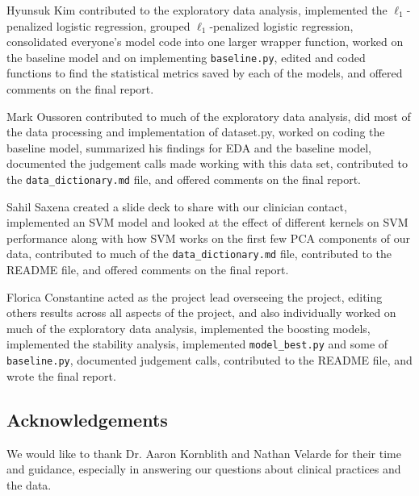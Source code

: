 \documentclass[11pt, letterpaper]{amsart}
\let\Oldsubsection\subsection
\renewcommand{\subsection}{\FloatBarrier\Oldsubsection}
\begin{document}
Hyunsuk Kim contributed to the exploratory data analysis, implemented the $\ell_1$-penalized logistic regression, grouped $\ell_1$-penalized logistic regression, consolidated everyone's model code into one larger wrapper function, worked on the baseline model and on implementing \texttt{baseline.py}, edited and coded functions to find the statistical metrics saved by each of the models, and offered comments on the final report.

Mark Oussoren contributed to much of the exploratory data analysis, did most of the data processing and implementation of dataset.py, worked on coding the baseline model, summarized his findings for EDA and the baseline model, documented the judgement calls made working with this data set, contributed to the \texttt{data\_dictionary.md} file, and offered comments on the final report.

Sahil Saxena created a slide deck to share with our clinician contact, implemented an SVM model and looked at the effect of different kernels on SVM performance along with how SVM works on the first few PCA components of our data, contributed to much of the \texttt{data\_dictionary.md} file, contributed to the README file, and offered comments on the final report.

Florica Constantine acted as the project lead overseeing the project, editing others results across all aspects of the project, and also individually worked on much of the exploratory data analysis, implemented the boosting models, implemented the stability analysis, implemented \texttt{model\_best.py} and some of \texttt{baseline.py}, documented judgement calls, contributed to the README file, and wrote the final report.

\subsection{Acknowledgements}

We would like to thank Dr. Aaron Kornblith and Nathan Velarde for their time and guidance, especially in answering our questions about clinical practices and the data. 

\printbibliography
\end{document}

